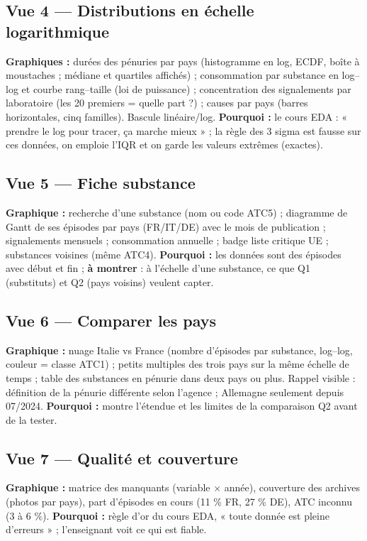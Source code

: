 \documentclass[10.5pt, a4paper]{article}
\begin{document}
\subsection*{Vue 4 --- Distributions en échelle logarithmique}
\textbf{Graphiques :} durées des pénuries par pays (histogramme en log, ECDF, boîte à moustaches ; médiane et quartiles affichés) ;
consommation par substance en log--log et courbe rang--taille (loi de puissance) ; concentration des signalements par laboratoire
(les 20 premiers = quelle part ?) ; causes par pays (barres horizontales, cinq familles). Bascule linéaire/log.
\textbf{Pourquoi :} le cours EDA : « prendre le log pour tracer, ça marche mieux » ; la règle des 3 sigma est fausse sur ces données, on emploie l'IQR et on garde les valeurs extrêmes (exactes).

\subsection*{Vue 5 --- Fiche substance}
\textbf{Graphique :} recherche d'une substance (nom ou code ATC5) ; diagramme de Gantt de ses épisodes par pays (FR/IT/DE) avec le
mois de publication ; signalements mensuels ; consommation annuelle ; badge liste critique UE ; substances voisines (même ATC4).
\textbf{Pourquoi :} les données sont des épisodes avec début et fin ; \textbf{à montrer} : à l'échelle d'une substance, ce que Q1 (substituts) et Q2 (pays voisins) veulent capter.

\subsection*{Vue 6 --- Comparer les pays}
\textbf{Graphique :} nuage Italie vs France (nombre d'épisodes par substance, log--log, couleur = classe ATC1) ;
petits multiples des trois pays sur la même échelle de temps ; table des substances en pénurie dans deux pays ou plus.
Rappel visible : définition de la pénurie différente selon l'agence ; Allemagne seulement depuis 07/2024.
\textbf{Pourquoi :} montre l'étendue et les limites de la comparaison Q2 avant de la tester.

\subsection*{Vue 7 --- Qualité et couverture}
\textbf{Graphique :} matrice des manquants (variable $\times$ année), couverture des archives (photos par pays), part d'épisodes en cours
(11 \% FR, 27 \% DE), ATC inconnu (3 à 6 \%). \textbf{Pourquoi :} règle d'or du cours EDA, « toute donnée est pleine d'erreurs » ; l'enseignant voit ce qui est fiable.
\end{document}
